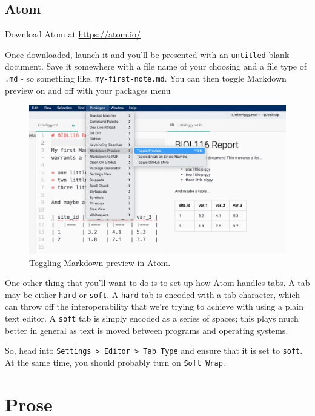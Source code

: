 \documentclass[
]{book}
\begin{document}
\hypertarget{atom}{%
\subsection*{Atom}\label{atom}}

Download Atom at \url{https://atom.io/}

Once downloaded, launch it and you'll be presented with an \texttt{untitled} blank document. Save it somewhere with a file name of your choosing and a file type of \texttt{.md} - so something like, \texttt{my-first-note.md}. You can then toggle Markdown preview on and off with your packages menu

\begin{figure}
\centering
\includegraphics{images/MD_preview-toggle.png}
\caption{Toggling Markdown preview in Atom.}
\end{figure}

One other thing that you'll want to do is to set up how Atom handles tabs. A tab may be either \texttt{hard} or \texttt{soft}. A \texttt{hard} tab is encoded with a tab character, which can throw off the interoperability that we're trying to achieve with using a plain text editor. A \texttt{soft} tab is simply encoded as a series of spaces; this plays much better in general as text is moved between programs and operating systems.

So, head into \texttt{Settings\ \textgreater{}\ Editor\ \textgreater{}\ Tab\ Type} and ensure that it is set to \texttt{soft}. At the same time, you should probably turn on \texttt{Soft\ Wrap}.

\hypertarget{prose}{%
\section{Prose}\label{prose}}
\end{document}
